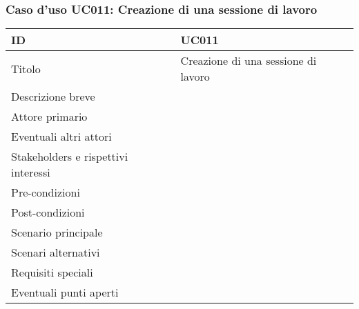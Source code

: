 \documentclass[../../main.tex]{subfiles}
\begin{document}
\subsubsection{Caso d’uso UC011: Creazione di una sessione di lavoro }
\begin{tabularx}{150mm}{|l|X|}
    \hline
    ID                                  & \textbf{UC011}\\
    \hline
    Titolo                              & Creazione di una sessione di lavoro \\
    \hline
    Descrizione breve                   &    \\
    \hline
    Attore primario                     &    \\
    \hline
    Eventuali altri attori              &    \\
    \hline
    Stakeholders e rispettivi interessi &    \\
    \hline
    Pre-condizioni                      &    \\
    \hline
    Post-condizioni                     &    \\
    \hline
    Scenario principale                 &    \\
    \hline
    Scenari alternativi                 &    \\
    \hline
    Requisiti speciali                  &    \\
    \hline
    Eventuali punti aperti              &    \\
    \hline
\end{tabularx}
\newpage
\end{document}
